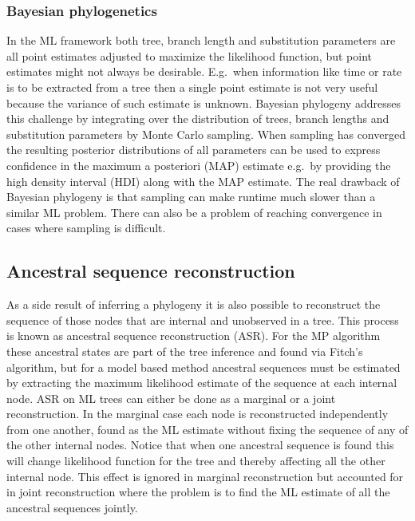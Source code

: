 \subsubsection{Bayesian phylogenetics}
In the ML framework both tree, branch length and substitution parameters are all point estimates adjusted to maximize the likelihood function, but point estimates might not always be desirable.
E.g.\ when information like time or rate is to be extracted from a tree then a single point estimate is not very useful because the variance of such estimate is unknown.
Bayesian phylogeny addresses this challenge by integrating over the distribution of trees, branch lengths and substitution parameters by Monte Carlo sampling.
When sampling has converged the resulting posterior distributions of all parameters can be used to express confidence in the maximum a posteriori (MAP) estimate e.g.\ by providing the high density interval (HDI) along with the MAP estimate.
The real drawback of Bayesian phylogeny is that sampling can make runtime much slower than a similar ML problem.
There can also be a problem of reaching convergence in cases where sampling is difficult.





\subsection{Ancestral sequence reconstruction}
As a side result of inferring a phylogeny it is also possible to reconstruct the sequence of those nodes that are internal and unobserved in a tree.
This process is known as ancestral sequence reconstruction (ASR).
For the MP algorithm these ancestral states are part of the tree inference and found via Fitch's algorithm, but for a model based method ancestral sequences must be estimated by extracting the maximum likelihood estimate of the sequence at each internal node.
ASR on ML trees can either be done as a marginal or a joint reconstruction.
In the marginal case each node is reconstructed independently from one another, found as the ML estimate without fixing the sequence of any of the other internal nodes.
Notice that when one ancestral sequence is found this will change likelihood function for the tree and thereby affecting all the other internal node.
This effect is ignored in marginal reconstruction but accounted for in joint reconstruction where the problem is to find the ML estimate of all the ancestral sequences jointly.

